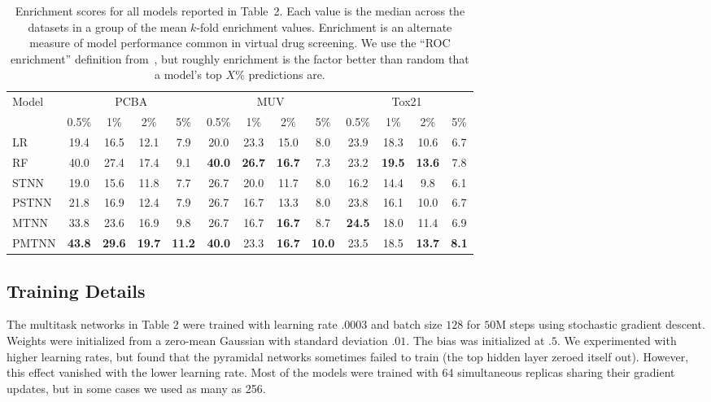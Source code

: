 \begin{table}[ht]
\centering
\caption{Enrichment scores for all models reported in Table~2. Each value
  is the median across the datasets in a group of the mean $k$-fold
  enrichment values. Enrichment is an alternate measure of model performance
  common in virtual drug screening. We use the ``ROC enrichment'' definition
  from~\cite{jain2008recommendations}, but roughly enrichment is the factor
  better than random that a model's top $X\%$ predictions are.}
\label{tab:enrichment}
\vskip 0.2in
\begin{tabular}{l|cccc|cccc|cccc}
\toprule
Model & \multicolumn{4}{|c|}{PCBA} & \multicolumn{4}{|c|}{MUV} &
 \multicolumn{4}{|c}{Tox21} \\
&
0.5\% & 1\% & 2\% & 5\% &
0.5\% & 1\% & 2\% & 5\% &
0.5\% & 1\% & 2\% & 5\% \\
\midrule
LR
& 19.4 &   16.5 &   12.1 &   7.9
& 20.0 &   23.3 &   15.0 &   8.0
& 23.9 &   18.3 &   10.6 &   6.7
\\
RF
& 40.0 &   27.4 &   17.4 &   9.1
& \textbf{40.0} &   \textbf{26.7} &   \textbf{16.7} &   7.3
& 23.2 &   \textbf{19.5} &   \textbf{13.6} &   7.8
\\
STNN
& 19.0 &   15.6 &   11.8 &   7.7
& 26.7 &   20.0 &   11.7 &   8.0
& 16.2 &   14.4 &   9.8  &   6.1
\\
PSTNN
& 21.8 &   16.9 &   12.4 &   7.9
& 26.7 &   16.7 &   13.3 &   8.0
& 23.8 &   16.1 &   10.0 &   6.7
\\
MTNN
& 33.8 &   23.6 &   16.9 &   9.8
& 26.7 &   16.7 &   \textbf{16.7} &   8.7
& \textbf{24.5} &   18.0 &   11.4 &   6.9
\\
PMTNN
& \textbf{43.8} &   \textbf{29.6} &   \textbf{19.7} &   \textbf{11.2}
& \textbf{40.0} &   23.3 &   \textbf{16.7} &   \textbf{10.0}
& 23.5 &   18.5 &   \textbf{13.7} &   \textbf{8.1}
\\
\bottomrule
\end{tabular}
\end{table}

\clearpage

\subsection{Training Details}
The multitask networks in Table 2 were trained with learning rate $.0003$
and batch size $128$ for $50$M steps using stochastic gradient descent.
Weights were initialized from a zero-mean Gaussian with standard deviation
$.01$. The bias was initialized at $.5$. We experimented with higher
learning rates, but found that the pyramidal networks sometimes failed to
train (the top hidden layer zeroed itself out). However, this effect
vanished with the lower learning rate.  Most of the models were trained
with 64 simultaneous replicas sharing their gradient updates, but in some
cases we used as many as 256.

